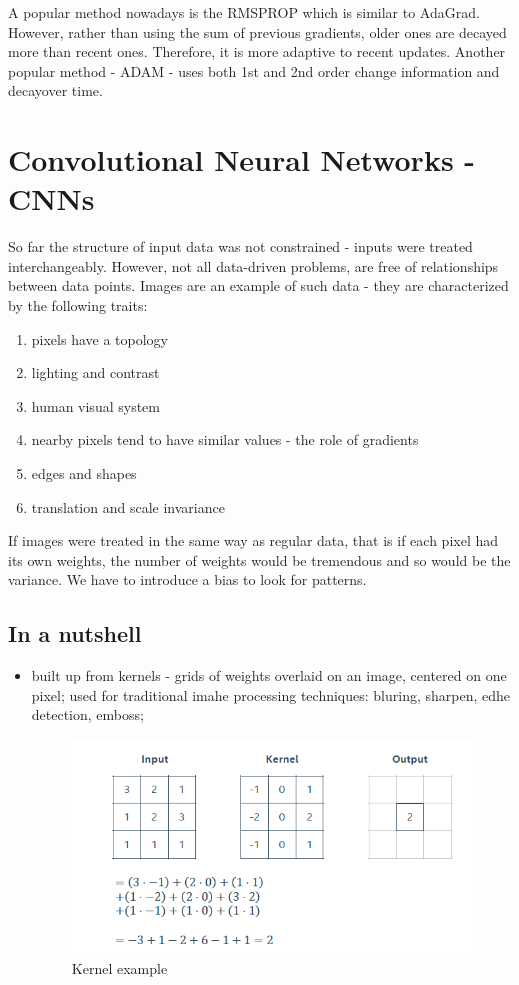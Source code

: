 \documentclass[11pt]{book}
\begin{document}
A popular method nowadays is the RMSPROP which is similar to AdaGrad. However, rather than using the sum of previous gradients, older ones are decayed more than recent ones. Therefore, it is more adaptive to recent updates. Another popular method - ADAM - uses both 1st and 2nd order change information and decayover time.


\section{Convolutional Neural Networks - CNNs}

So far the structure of input data was not constrained - inputs were treated interchangeably. However, not all data-driven problems, are free of relationships between data points. Images are an example of such data - they are characterized by the following traits:

\begin{enumerate}
\item pixels have a topology
\item lighting and contrast
\item human visual system
\item nearby pixels tend to have similar values - the role of gradients
\item edges and shapes
\item translation and scale invariance

\end{enumerate}

If images were treated in the same way as regular data, that is if each pixel had its own weights, the number of weights would be tremendous and so would be the variance. We have to introduce a bias to look for patterns. 

\subsection{In a nutshell}

\begin{itemize}
\item built up from kernels - grids of weights overlaid on an image, centered on one pixel; used for traditional imahe processing techniques: bluring, sharpen, edhe detection, emboss;

\begin{figure}[H]
    \centering
    \includegraphics[width=0.75\linewidth]{kernel_example.PNG}
    \caption{Kernel example}
\end{figure}

\end{itemize}
\end{document}
